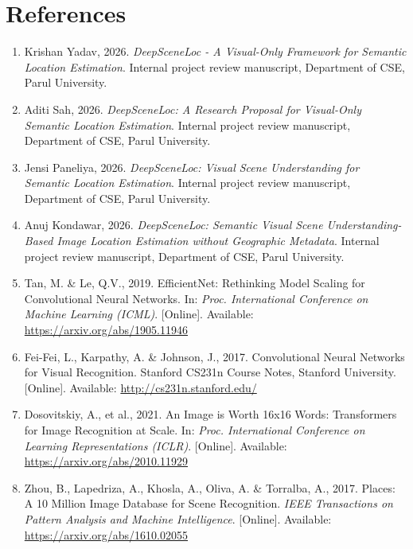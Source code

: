 \chapter*{References}

\begin{enumerate}
\item Krishan Yadav, 2026. \textit{DeepSceneLoc - A Visual-Only Framework for Semantic Location Estimation}. Internal project review manuscript, Department of CSE, Parul University.

\item Aditi Sah, 2026. \textit{DeepSceneLoc: A Research Proposal for Visual-Only Semantic Location Estimation}. Internal project review manuscript, Department of CSE, Parul University.

\item Jensi Paneliya, 2026. \textit{DeepSceneLoc: Visual Scene Understanding for Semantic Location Estimation}. Internal project review manuscript, Department of CSE, Parul University.

\item Anuj Kondawar, 2026. \textit{DeepSceneLoc: Semantic Visual Scene Understanding-Based Image Location Estimation without Geographic Metadata}. Internal project review manuscript, Department of CSE, Parul University.

\item Tan, M. \& Le, Q.V., 2019. EfficientNet: Rethinking Model Scaling for Convolutional Neural Networks. In: \textit{Proc. International Conference on Machine Learning (ICML)}. [Online]. Available: \url{https://arxiv.org/abs/1905.11946}

\item Fei-Fei, L., Karpathy, A. \& Johnson, J., 2017. Convolutional Neural Networks for Visual Recognition. Stanford CS231n Course Notes, Stanford University. [Online]. Available: \url{http://cs231n.stanford.edu/}

\item Dosovitskiy, A., et al., 2021. An Image is Worth 16x16 Words: Transformers for Image Recognition at Scale. In: \textit{Proc. International Conference on Learning Representations (ICLR)}. [Online]. Available: \url{https://arxiv.org/abs/2010.11929}

\item Zhou, B., Lapedriza, A., Khosla, A., Oliva, A. \& Torralba, A., 2017. Places: A 10 Million Image Database for Scene Recognition. \textit{IEEE Transactions on Pattern Analysis and Machine Intelligence}. [Online]. Available: \url{https://arxiv.org/abs/1610.02055}


\end{enumerate}
